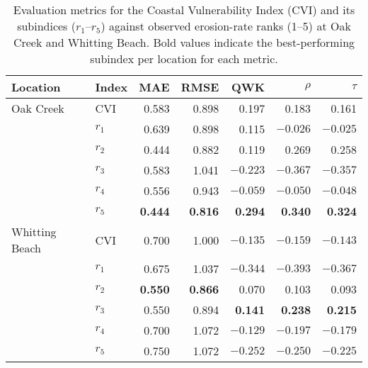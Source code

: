 \begin{table}[htbp]
\centering
\caption{Evaluation metrics for the Coastal Vulnerability Index (CVI) and its
subindices ($r_1$--$r_5$) against observed erosion-rate ranks (1--5) at Oak
Creek and Whitting Beach. Bold values indicate the best-performing subindex per
location for each metric.}
\label{tab:cvi_eval_oak_whitting}
\begin{tabular}{l l r r r r r}
\toprule
Location & Index & MAE & RMSE & QWK & $\rho$ & $\tau$ \\
\midrule
Oak Creek & CVI   & 0.583 & 0.898 &  0.197 &  0.183 &  0.161 \\
          & $r_1$ & 0.639 & 0.898 &  0.115 & $-0.026$ & $-0.025$ \\
          & $r_2$ & 0.444 & 0.882 &  0.119 &  0.269 &  0.258 \\
          & $r_3$ & 0.583 & 1.041 & $-0.223$ & $-0.367$ & $-0.357$ \\
          & $r_4$ & 0.556 & 0.943 & $-0.059$ & $-0.050$ & $-0.048$ \\
          & $r_5$ & \textbf{0.444} & \textbf{0.816} & \textbf{0.294} & \textbf{0.340} & \textbf{0.324} \\
\midrule
Whitting Beach & CVI   & 0.700 & 1.000 & $-0.135$ & $-0.159$ & $-0.143$ \\
               & $r_1$ & 0.675 & 1.037 & $-0.344$ & $-0.393$ & $-0.367$ \\
               & $r_2$ & \textbf{0.550} & \textbf{0.866} &  0.070 &  0.103 &  0.093 \\
               & $r_3$ & 0.550 & 0.894 & \textbf{0.141} & \textbf{0.238} & \textbf{0.215} \\
               & $r_4$ & 0.700 & 1.072 & $-0.129$ & $-0.197$ & $-0.179$ \\
               & $r_5$ & 0.750 & 1.072 & $-0.252$ & $-0.250$ & $-0.225$ \\
\bottomrule
\end{tabular}
\end{table}

